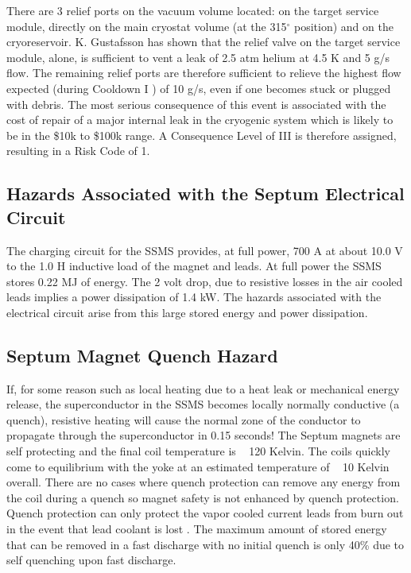 There are 3 relief ports on the vacuum volume located: on the target service module, directly on the main 
cryostat volume (at the 315$^\circ$ position) and on the cryoreservoir.  K. Gustafsson has shown 
 that the relief valve on the target service module, alone, is sufficient to vent a leak of 2.5 atm 
helium at 4.5 K and 5 g/s flow.  The remaining relief ports are therefore sufficient to relieve the 
highest flow expected (during Cooldown I ) of 10 g/s, even if one becomes stuck or plugged with debris.  
The most serious consequence of this event is associated with the cost of repair of a major internal leak 
in the cryogenic system which is likely to be in the \$10k to \$100k range.  A Consequence Level of III is 
therefore assigned, resulting in a Risk Code of 1.

\begin{safetyen}{10}{15}
\subsection {\bf Hazards Associated with the Septum Electrical Circuit}
\end{safetyen}

The charging circuit for the SSMS provides, at full power, 700 A at about 10.0  V to the 1.0  H inductive 
load of the magnet and leads.  At full power the SSMS stores 0.22 MJ of energy.  The 2 volt drop, due to 
resistive losses in the air cooled leads implies a power dissipation of 1.4 kW.  The hazards associated 
with the electrical circuit arise from this large stored energy and power dissipation.

\begin{safetyen}{10}{15}
\subsection {\bf Septum Magnet Quench Hazard}
\end{safetyen}
If, for some reason such as local heating due to a heat leak or mechanical energy release, the superconductor 
in the SSMS becomes locally normally conductive (a quench), resistive heating will cause the normal zone of 
the conductor to propagate through the superconductor in 0.15 seconds! The Septum magnets are self protecting 
and the final coil temperature is ~ 120 Kelvin. The coils quickly come to equilibrium with the yoke at an 
estimated temperature of ~ 10 Kelvin overall. There are no cases where quench protection can remove any energy 
from the coil during a quench so magnet safety is not enhanced by quench protection. Quench protection can only 
protect the vapor cooled current leads from burn out in the event that lead coolant is lost . The maximum amount 
of stored energy that can be removed in a fast discharge with no initial quench is only 40\% due to self 
quenching upon fast discharge.

